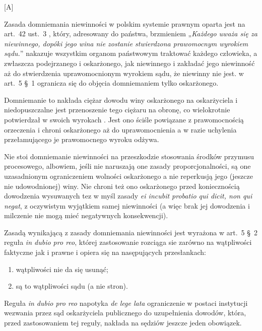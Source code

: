 \setcounter{zagc}{17}[{\kolor A}]

Zasada domniemania niewinności w polskim systemie prawnym oparta jest na art. 42 ust. 3 , który, adresowany do państwa, brzmieniem „\textit{Każdego uważa się za niewinnego, dopóki jego wina nie zostanie stwierdzona prawomocnym wyrokiem sądu.}” nakazuje wszystkim organom państwowym traktować każdego człowieka, a zwłaszcza podejrzanego i oskarżonego, jak niewinnego i zakładać jego niewinność aż do stwierdzenia uprawomocnionym wyrokiem sądu, że niewinny nie jest.
 w art. 5 § 1 ogranicza się do objęcia domniemaniem tylko oskarżonego.\medskip

Domniemanie to nakłada ciężar dowodu winy oskarżonego na oskarżyciela i niedopuszczalne jest przenoszenie tego ciężaru na obronę, co wielokrotnie potwierdzał w swoich wyrokach . Jest ono ściśle powiązane z prawomocnością orzeczenia i chroni oskarżonego aż do uprawomocnienia a w razie uchylenia przełamującego je prawomocnego wyroku odżywa.\medskip

Nie stoi domniemanie niewinności na przeszkodzie stosowania środków przymusu procesowego, albowiem, jeśli nie naruszają one zasady proporcjonalności, są one uzasadnionym ograniczeniem wolności oskarżonego a nie reperkusją jego (jeszcze nie udowodnionej) winy. Nie chroni też ono oskarżonego przed koniecznością dowodzenia wysuwanych tez w myśl zasady \textit{ei incubit probatio qui dicit, non qui negat}, z oczywistym wyjątkiem samej niewinności (a więc brak jej dowodzenia i milczenie nie mogą mieć negatywnych konsekwencji).\medskip

Zasadą wynikającą z zasady domniemania niewinności jest wyrażona w art. 5 § 2  reguła \textit{in dubio pro reo}, której zastosowanie rozciąga sie zarówno na wątpliwości faktyczne jak i prawne i opiera się na nasępujących przesłankach:\begin{enumerate}
    \item wątpliwości nie da się usunąć;
    \item są to wątpliwości sądu (a nie stron).
\end{enumerate}

Reguła \textit{in dubio pro reo} napotyka \textit{de lege lata} ograniczenie w postaci instytucji wezwania przez sąd oskarżyciela publicznego do uzupełnienia dowodów, która, przed zastosowaniem tej reguły, nakłada na sędziów jeszcze jeden obowiązek.
